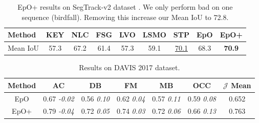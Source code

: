 \documentclass[10pt,twocolumn,letterpaper]{article}
\newcommand{\rowSpace}{\vspace{-0.4cm}}
\begin{document}
\setlength{\tabcolsep}{1.6pt}
\begin{table}
\begin{center}
\centering
\begin{tabular}{l|cccccccc}
\hline
\hline
Method & KEY & NLC & FSG & LVO & LSMO & STP & EpO & EpO+ \\
\hline
Mean IoU & 57.3 & 67.2 & 61.4 & 57.3 & 59.1 & \underline{70.1} & 68.3 & \bf{70.9} \\
\hline
\hline
\end{tabular}
\caption{EpO+ results on SegTrack-v2 dataset \cite{segtrackv2}. We only perform bad on one sequence (birdfall). Removing this increase our Mean IoU to 72.8. \label{tab:quantSegTrack}
}
\vspace{-0.3in}
\end{center}
\end{table}


\setlength{\tabcolsep}{1.0pt}
\begin{table}[!h]
\begin{center}
\centering
\begin{tabular}{c|cccccc}
\hline
\hline
Method & AC & DB & FM & MB & OCC & $\mathcal{J}$ Mean \\  
\hline
EpO & 0.67 \emph{\scriptsize{-0.02}} & 0.56 \emph{\scriptsize{0.10}} & 0.62 \emph{\scriptsize{0.04}} &  0.57 \emph{\scriptsize{0.11}} & 0.59 \emph{\scriptsize{0.08}} & 0.652 \\

EpO+ & 0.79 \emph{\scriptsize{-0.04}} & 0.72 \emph{\scriptsize{0.05}} & 0.74 \emph{\scriptsize{0.03}} &  0.72 \emph{\scriptsize{0.06}} & 0.66 \emph{\scriptsize{0.13}} & 0.763 \\
\hline
\hline
\end{tabular}
\caption{Results on DAVIS 2017 dataset.\label{Tab:DAVIS2017}}
\rowSpace
\rowSpace
\end{center}
\end{table}
\end{document}
